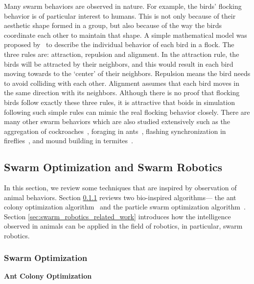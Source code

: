 Many swarm behaviors are observed in nature. For example, the birds' flocking behavior is of particular interest to humans. This is not only because of their aesthetic shape formed in a group, but also because of the way the birds coordinate each other to maintain that shape. A simple mathematical model was proposed by~\cite{Craig:CG:1987} to describe the individual behavior of each bird in a flock. The three rules are: attraction, repulsion and alignment. In the attraction rule, the birds will be attracted by their neighbors, and this would result in each bird moving towards to the `center' of their neighbors. Repulsion means the bird needs to avoid colliding with each other. Alignment assumes that each bird moves in the same direction with its neighbors. Although there is no proof that flocking birds follow exactly these three rules, it is attractive that boids in simulation following such simple rules can mimic the real flocking behavior closely. There are many other swarm behaviors which are also studied extensively such as the aggregation of cockroaches~\cite{Jeanson:AB:2005}, foraging in ants~\cite{Carroll1973}, flashing synchronization in fireflies~\cite{James:ARE:1971}, and mound building in termites~\cite{Bruinsma:PHD:1979}. 

\subsection{Swarm Optimization and Swarm Robotics}\label{sec:swarm_optimization_swarm_robotics}

In this section, we review some techniques that are inspired by observation of animal behaviors. Section \ref{sec:swarm_optimization_related_work} reviews two bio-inspired algorithms--- the ant colony optimization algorithm~\cite{Dorigo_1997} and the particle swarm optimization algorithm~\cite{Kennedy:ICNN:1995}. Section \ref{sec:swarm_robotics_related_work} introduces how the intelligence observed in animals can be applied in the field of robotics, in particular, swarm robotics.

\subsubsection{Swarm Optimization}\label{sec:swarm_optimization_related_work}

\textbf{Ant Colony Optimization}

